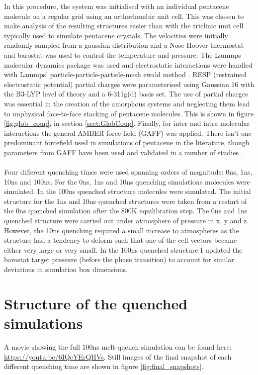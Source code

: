 \noindent In this procedure, the system was initialised with an individual pentacene molecule on a regular  grid using an orthorhombic unit cell. This was chosen to make analysis of the resulting structures easier than with the triclinic unit cell typically used to simulate pentacene crystals. The velocities were initially randomly sampled from a gaussian distribution and a Nose-Hoover thermostat and barostat was used to control the temperature and pressure. The Lammps molecular dynamics package was used \cite{LammpsMain, LammpsURL} and electrostatic interactions were handled with Lammps' particle-particle-particle-mesh ewald method \cite{LammpsPPPME}. RESP \cite{RESP} (restrained electrostatic potential) partial charges were parameterised using Gaussian 16 \cite{g16} with the B3-LYP\cite{B3,LYP} level of theory and a 6-311g(d) basis set. The use of partial charges was essential in the creation of the amorphous systems and neglecting them lead to unphysical face-to-face stacking of pentacene molecules. This is shown in figure \ref{fig:glob_coup}, in section \ref{sect:GlobCoup}. Finally, for inter and intra molecular interactions the general AMBER force-field \cite{GAFF} (GAFF) was applied. There isn't one predominant forcefield used in simulations of pentacene in the literature, though parameters from GAFF have been used and validated in a number of studies \cite{C0JM01577F, Yoneya2012, PentCrystallisation, MILLER201728, Wang2011, C6CP06436A, doi:10.1246/cl.180450}.
\\\\
Four different quenching times were used spanning  orders of magnitude: 0ns, 1ns, 10ns and 100ns. For the 0ns, 1ns and 10ns quenching simulations  molecules were simulated. In the 100ns quenched structure  molecules were simulated. The initial structure for the 1ns and 10ns quenched structures were taken from a restart of the 0ns quenched simulation after the 800K equilibration step. The 0ns and 1ns quenched structure were carried out under  atmosphere of pressure in x, y and z. However, the 10ns quenching required a small increase to  atmospheres as the structure had a tendency to deform such that one of the cell vectors became either very large or very small. In the 100ns quenched structure I updated the barostat target pressure (before the phase transition) to account for similar deviations in simulation box dimensions.
\section{Structure of the quenched simulations}
A movie showing the full 100ns melt-quench simulation can be found here: \href{https://youtu.be/6IQcYErQHVs}{https://youtu.be/6IQcYErQHVs}. Still images of the final snapshot of each different quenching time are shown in figure \ref{fig:final_snapshots}.
